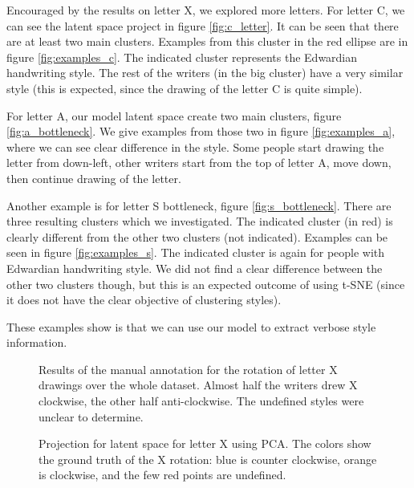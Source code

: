 \documentclass[conference]{IEEEtran}
\begin{document}
\par Encouraged by the results on letter X, we explored more letters. For letter C, we can see the latent space project in figure \ref{fig:c_letter}. It can be seen that there are at least two main clusters. Examples from this cluster in the red ellipse are in figure \ref{fig:examples_c}. The indicated cluster represents the Edwardian handwriting style. The rest of the writers (in the big cluster) have a very similar style (this is expected, since the drawing of the letter C is quite simple).

\par For letter A, our model latent space create two main clusters, figure \ref{fig:a_bottleneck}. We give examples from those two in figure \ref{fig:examples_a}, where we can see clear difference in the style. Some people start drawing the letter from down-left, other writers start from the top of letter A, move down, then continue drawing of the letter.

\par Another example is for letter S bottleneck, figure \ref{fig:s_bottleneck}. There are three resulting clusters which we investigated. The indicated cluster (in red) is clearly different from the other two clusters (not indicated). Examples can be seen in figure \ref{fig:examples_s}. The indicated cluster is again for people with Edwardian handwriting style. We did not find a clear difference between the other two clusters though, but this is an expected outcome of using t-SNE (since it does not have the clear objective of clustering styles).

\par These examples show is that we can use our model to extract verbose style information. 
\begin{figure}[htbp!]
    \centering
    \caption{Results of the manual annotation for the rotation of letter X drawings over the whole dataset. Almost half the writers drew X clockwise, the other half anti-clockwise. The undefined styles were unclear to determine.}
    \label{fig:x_rotation}
\end{figure}

\begin{figure}[htbp!]
    \centering
    \caption{Projection for latent space for letter X using PCA. The colors show the ground truth of the X rotation: blue is counter clockwise, orange is clockwise, and the few red points are undefined.}
    \label{fig:x_bottleneck}
\end{figure}
\end{document}
